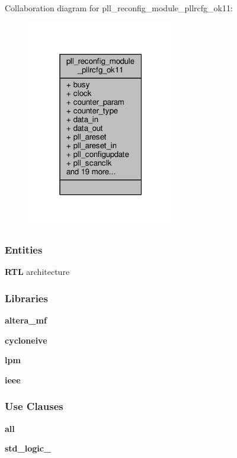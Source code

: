 Collaboration diagram for pll\+\_\+reconfig\+\_\+module\+\_\+pllrcfg\+\_\+ok11\+:\nopagebreak
\begin{figure}[H]
\begin{center}
\leavevmode
\includegraphics[width=183pt]{de/dec/classpll__reconfig__module__pllrcfg__ok11__coll__graph}
\end{center}
\end{figure}
\subsubsection*{Entities}
\begin{DoxyCompactItemize}
\item 
{\bf R\+TL} architecture
\end{DoxyCompactItemize}
\subsubsection*{Libraries}
 \begin{DoxyCompactItemize}
\item 
{\bf altera\+\_\+mf} 
\item 
{\bf cycloneive} 
\item 
{\bf lpm} 
\item 
{\bf ieee} 
\end{DoxyCompactItemize}
\subsubsection*{Use Clauses}
 \begin{DoxyCompactItemize}
\item 
{\bf  all }   
\item 
{\bf std\+\_\+logic\+\_}   
\end{DoxyCompactItemize}
